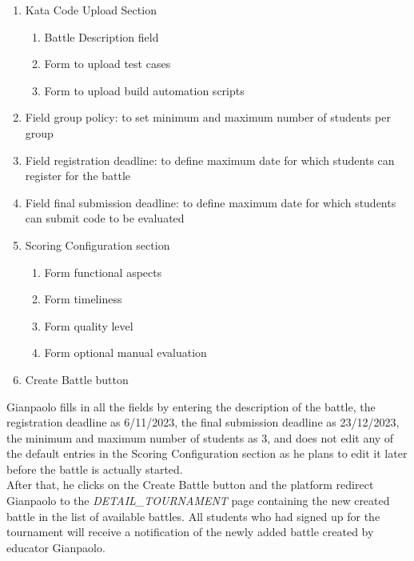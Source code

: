 \begin{enumerate}
	      \begin{enumerate}
		      \item Kata Code Upload Section
		            \begin{enumerate}
			            \item Battle Description field
			            \item Form to upload test cases
			            \item Form to upload build automation scripts
		            \end{enumerate}
		      \item Field group policy: to set minimum and maximum number of students per group
		      \item Field registration deadline: to define maximum date for which students can register for the battle
		      \item Field final submission deadline: to define maximum date for which students can submit code to be evaluated
		      \item Scoring Configuration section

		            \begin{enumerate}
			            \item Form functional aspects
			            \item Form timeliness
			            \item Form quality level
			            \item Form optional manual evaluation
		            \end{enumerate}


		      \item Create Battle button
	      \end{enumerate}

	      Gianpaolo fills in all the fields by entering the description of the battle, the registration deadline as 6/11/2023, the final submission deadline as 23/12/2023, the minimum
	      and maximum number of students as 3, and does not edit any of the default entries in the Scoring Configuration section as he plans to edit it later before the battle is
	      actually started.\\
	      After that, he clicks on the Create Battle button and the platform redirect Gianpaolo to the \emph{DETAIL\_TOURNAMENT} page containing the new created battle in the list of available battles.
	      All students who had signed up for the tournament will receive a notification of the newly added battle created by educator Gianpaolo.




\end{enumerate}
